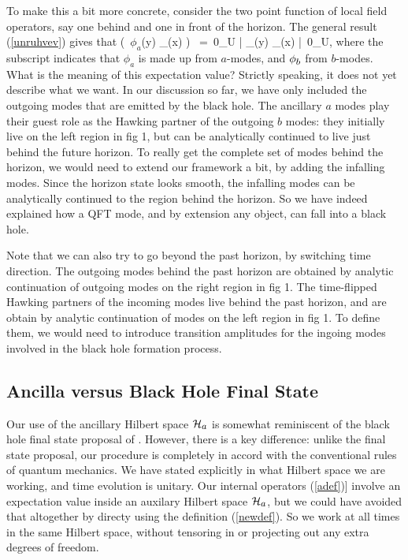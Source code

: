 \documentclass[12pt]{article}%
\def\spc{\hspace{.5pt}}
\begin{document}
To make this a bit more concrete, consider the two point function of local field operators, say one behind and one in front of the horizon.
The general result (\ref{unruhvev}) gives that
\bea
\tr\bigr(\rho \,  \mbox{\boldmath $\phi_a$}(y) \phi_\bbbb(x) \bigr) \, =\,  
\la \spc 0_{\spc U} \bigl| \phi_\aaaa(y) \spc \phi_\bbbb(x) \bigl|\, 0_{\spc U}\ra ,
\eea  
where the subscript indicates that $\phi_a$ is made up from $a$-modes, and  $\phi_\bbbb$ from $b$-modes.
What is the meaning of this expectation value?  Strictly speaking, it does not yet describe what we want. In our discussion so far, we have only 
included the outgoing modes that are emitted by the black hole. The ancillary $a$ modes play their guest role as the Hawking partner
of the outgoing $b$ modes: they initially live on the left region in fig 1, but can be analytically continued to live just behind the future horizon.
To really get the complete set of modes behind the horizon, we would need to extend our framework a bit, by adding the infalling modes.
Since the horizon state looks smooth, the infalling modes  can be analytically continued to the region behind the horizon. So we have
indeed explained how a QFT mode, and by extension any object, can fall into a black hole.

Note that we can also try to go beyond the past horizon, by switching  time direction.
 The outgoing modes behind the past horizon are obtained by analytic continuation of outgoing modes on the right region in fig 1.
 The time-flipped Hawking partners of the incoming modes live behind the past horizon, and are obtain by analytic continuation
  of modes on the left region in fig 1. To define them, we would need to introduce transition amplitudes
  for the ingoing modes involved in the black hole formation process.


\subsection{Ancilla versus Black Hole Final State}
\vspace{-2mm}

Our use of the ancillary Hilbert space ${\cal H}_\aaaa$ is somewhat reminiscent of the black hole final state proposal of \cite{finalstate}. However, there is a key difference:
unlike the final state proposal, our procedure is completely in accord with the conventional rules of quantum mechanics. We have stated explicitly in what Hilbert space
we are working, and time evolution is unitary.  Our internal operators (\ref{adef})] involve an expectation value inside an auxilary Hilbert space ${\cal H}_\aaaa$, but we could have avoided that altogether by directy using the definition (\ref{newdef}). So
we work at all times in the same Hilbert space, without tensoring in or projecting out any extra degrees of freedom.
\end{document}
